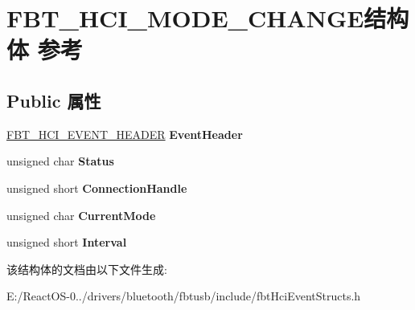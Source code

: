 \hypertarget{struct_f_b_t___h_c_i___m_o_d_e___c_h_a_n_g_e}{}\section{F\+B\+T\+\_\+\+H\+C\+I\+\_\+\+M\+O\+D\+E\+\_\+\+C\+H\+A\+N\+G\+E结构体 参考}
\label{struct_f_b_t___h_c_i___m_o_d_e___c_h_a_n_g_e}
\subsection*{Public 属性}
\begin{DoxyCompactItemize}
\item 
\mbox{\label{struct_f_b_t___h_c_i___m_o_d_e___c_h_a_n_g_e_a533b70069be7d8bf3b70591efb46ab2e}} 
\hyperlink{struct_f_b_t___h_c_i___e_v_e_n_t___h_e_a_d_e_r}{F\+B\+T\+\_\+\+H\+C\+I\+\_\+\+E\+V\+E\+N\+T\+\_\+\+H\+E\+A\+D\+ER} {\bfseries Event\+Header}
\item 
\mbox{\label{struct_f_b_t___h_c_i___m_o_d_e___c_h_a_n_g_e_af08c854187fef6717a34df1f232b0650}} 
unsigned char {\bfseries Status}
\item 
\mbox{\label{struct_f_b_t___h_c_i___m_o_d_e___c_h_a_n_g_e_a5224f4bb355fa17b4b0b360886d502bb}} 
unsigned short {\bfseries Connection\+Handle}
\item 
\mbox{\label{struct_f_b_t___h_c_i___m_o_d_e___c_h_a_n_g_e_a521353f666844c7427f74a889d3f82cb}} 
unsigned char {\bfseries Current\+Mode}
\item 
\mbox{\label{struct_f_b_t___h_c_i___m_o_d_e___c_h_a_n_g_e_a5939f273c34076860fc8aaf98d3cab3b}} 
unsigned short {\bfseries Interval}
\end{DoxyCompactItemize}


该结构体的文档由以下文件生成\+:\begin{DoxyCompactItemize}
\item 
E\+:/\+React\+O\+S-\/0../drivers/bluetooth/fbtusb/include/fbt\+Hci\+Event\+Structs.\+h\end{DoxyCompactItemize}
